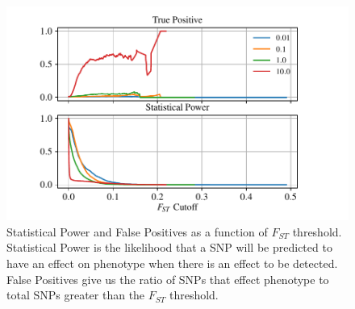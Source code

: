 \documentclass{article}
\begin{document}
\begin{figure}
    \begin{center}
        \includegraphics{Final_Plots/True_Power_0_5_500.pdf}
          \caption{ 
        Statistical Power and False Positives as a function of $F_{ST}$ threshold. 
        Statistical Power is the likelihood that a SNP will be predicted to have an effect on phenotype when there is an effect to be detected.
        False Positives give us the ratio of SNPs that effect phenotype to total SNPs greater than the $F_{ST}$ threshold.
         	}
          \label{fig:Power_FP_5lakes}
    \end{center}
\end{figure}

\end{document}
